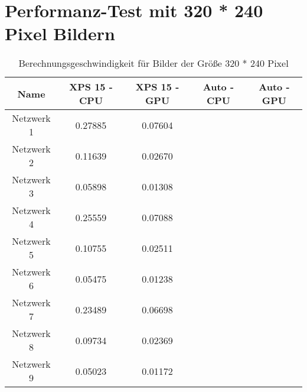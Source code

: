 \section{Performanz-Test mit 320 * 240 Pixel Bildern}
\begin{table}[H]
    \centering
    \begin{tabular}{ |c|c|c|c|c| }
        \hline
        \textbf{Name} & \textbf{XPS 15 - CPU} & \textbf{XPS 15 - GPU} & \textbf{Auto - CPU} & \textbf{Auto - GPU}   \\ \hline
        Netzwerk 1 & 0.27885 & 0.07604 & & \\ \hline
        Netzwerk 2 & 0.11639 & 0.02670 & & \\ \hline
        Netzwerk 3 & 0.05898 & 0.01308 & & \\ \hline
	
        Netzwerk 4 & 0.25559 & 0.07088 & & \\ \hline
        Netzwerk 5 & 0.10755 & 0.02511 & & \\ \hline
        Netzwerk 6 & 0.05475 & 0.01238 & & \\ \hline

        Netzwerk 7 & 0.23489 & 0.06698 & & \\ \hline
        Netzwerk 8 & 0.09734 & 0.02369 & & \\ \hline
        Netzwerk 9 & 0.05023 & 0.01172 & & \\ \hline
    \end{tabular}
    \caption{Berechnungsgeschwindigkeit für Bilder der Größe 320 * 240 Pixel}
    \label{tab:320x240}
\end{table}










